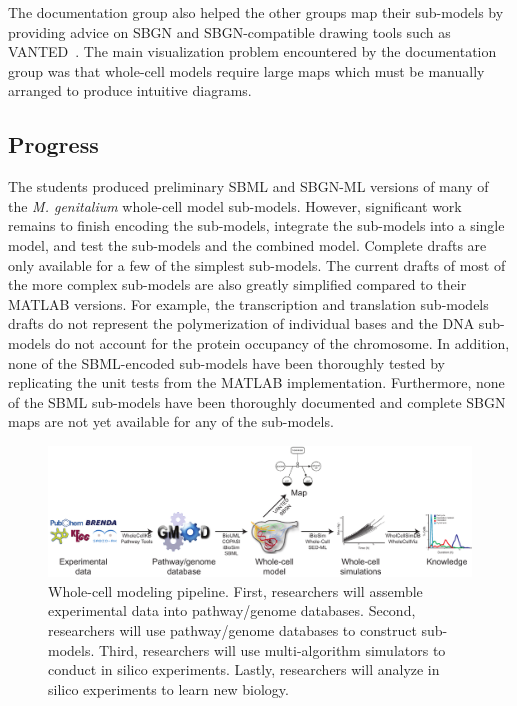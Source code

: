 \documentclass[journal,transmag]{IEEEtran}
\begin{document}
The documentation group also helped the other groups map their sub-models by providing advice on SBGN and SBGN-compatible drawing tools such as VANTED~\cite{Rohn2012}.
The main visualization problem encountered by the documentation group was that whole-cell models require large maps which must be manually arranged to produce intuitive diagrams.

\subsection{Progress}
The students produced preliminary SBML and SBGN-ML versions of many of the \textit{M. genitalium} whole-cell model sub-models. However, significant work remains to finish encoding the sub-models, integrate the sub-models into a single model, and test the sub-models and the combined model. Complete drafts are only available for a few of the simplest sub-models. The current drafts of most of the more complex sub-models are also greatly simplified compared to their MATLAB versions. For example, the transcription and translation sub-models drafts do not represent the polymerization of individual bases and the DNA sub-models do not account for the protein occupancy of the chromosome. In addition, none of the SBML-encoded sub-models have been thoroughly tested by replicating the unit tests from the MATLAB implementation. Furthermore, none of the SBML sub-models have been thoroughly documented and complete SBGN maps are not yet available for any of the sub-models.

\begin{figure}[bt!]
\centering
\includegraphics[width=\textwidth]{figure1/figure1.pdf}
\caption{\label{fig:1} Whole-cell modeling pipeline. First, researchers will assemble experimental data into pathway/genome databases. Second, researchers will use pathway/genome databases to construct sub-models. Third, researchers will use multi-algorithm simulators to conduct in silico experiments. Lastly, researchers will analyze in silico experiments to learn new biology.}
\end{figure}
\end{document}
